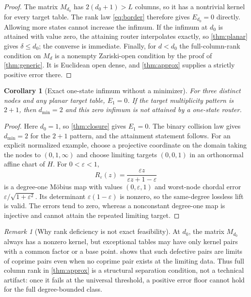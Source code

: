 \documentclass[11pt]{article}
\newtheorem{corollary}[theorem]{Corollary}
\theoremstyle{definition}\newtheorem{definition}[theorem]{Definition}\newtheorem{example}[theorem]{Example}
\theoremstyle{remark}\newtheorem{remark}[theorem]{Remark}\newtheorem{limitation}[theorem]{Limitation}
\begin{document}
\begin{proof}
The matrix $M_{d_0}$ has $2(d_0+1)>L$ columns, so it has a nontrivial kernel
for every target table.  The rank law \eqref{eq:border} therefore gives
$E_{d_0}=0$ directly.  Allowing more states cannot increase the infimum.  If
the infimum at $d_0$ is attained with value zero, the attaining
router interpolates exactly, so \cref{thm:planar} gives $\delta\le d_0$; the
converse is immediate.  Finally, for $d<d_0$ the full-column-rank condition on
$M_d$ is a nonempty Zariski-open condition by the proof of
\cref{thm:generic}.  It is Euclidean open dense, and \cref{thm:approx} supplies
a strictly positive error there.
\end{proof}

\begin{corollary}[Exact one-state infimum without a minimizer]\label{cor:eone}
For three distinct nodes and any planar target table, $E_1=0$.  If the target
multiplicity pattern is $2+1$, then $d_{\min}=2$ and this zero infimum is not
attained by a one-state router.
\end{corollary}

\begin{proof}
Here $d_0=1$, so \cref{thm:closure} gives $E_1=0$.  The binary collision law
gives $d_{\min}=2$ for the $2+1$ pattern, and the attainment statement follows.
For an explicit normalized example, choose a projective coordinate on the
domain taking the nodes to $(0,1,\infty)$ and choose limiting targets
$(0,0,1)$ in an orthonormal affine chart of $H$.  For
$0<\varepsilon<1$,
\[
 R_\varepsilon(z)=\frac{\varepsilon z}
                         {\varepsilon z+1-\varepsilon}
\]
is a degree-one M\"obius map with values $(0,\varepsilon,1)$ and worst-node
chordal error $\varepsilon/\sqrt{1+\varepsilon^2}$.  Its determinant
$\varepsilon(1-\varepsilon)$ is nonzero, so the same-degree lossless lift is
valid.  The errors tend to zero, whereas a nonconstant degree-one map is
injective and cannot attain the repeated limiting target.
\end{proof}

\begin{remark}[Why rank deficiency is not exact feasibility]
At $d_0$, the matrix $M_{d_0}$ always has a nonzero kernel, but exceptional
tables may have only kernel pairs with a common factor or a base point.
 shows that such defective pairs are limits of coprime pairs
even when no coprime pair exists at the limiting data.  Thus full column rank
in \cref{thm:approx} is a structural separation condition, not a technical
artifact: once it fails at the universal threshold, a positive error floor
cannot hold for the full degree-bounded class.
\end{remark}
\end{document}
